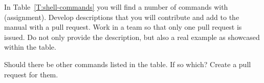 \begin{exercise}
\label{E:Linux.4} In Table~\ref{T:shell-commands} you will find a number
  of commands with (assignment). Develop descriptions that you will
  contribute and add to the manual with a pull request. Work in a team
  so that only one pull request is issued. Do not only provide the
  description, but also a real example as showcased within the table.
\end{exercise}

\begin{exercise}
\label{E:Linux.4} Should there be other commands listed in the table. If
  so which? Create a pull request for them. 
\end{exercise}


\